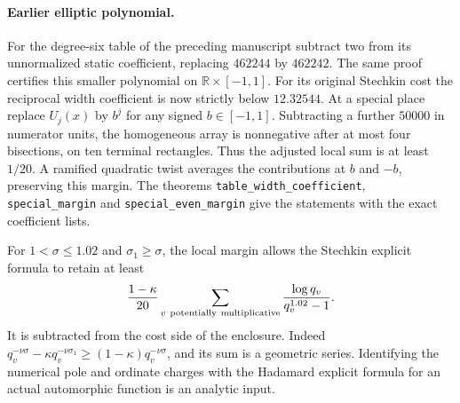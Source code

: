 \paragraph{Earlier elliptic polynomial.}
For the degree-six table of the preceding manuscript subtract two from its unnormalized static coefficient, replacing $462244$ by $462242$. The same proof certifies this smaller polynomial on $\mathbb R\times[-1,1]$. For its original Stechkin cost the reciprocal width coefficient is now strictly below $12.32544$. At a special place replace $U_j(x)$ by $b^j$ for any signed $b\in[-1,1]$. Subtracting a further $50000$ in numerator units, the homogeneous array is nonnegative after at most four bisections, on ten terminal rectangles. Thus the adjusted local sum is at least $1/20$. A ramified quadratic twist averages the contributions at $b$ and $-b$, preserving this margin. The theorems \texttt{table\_width\_coefficient}, \texttt{special\_margin} and \texttt{special\_even\_margin} give the statements with the exact coefficient lists.

For $1<\sigma\le1.02$ and $\sigma_1\ge\sigma$, the local margin allows the Stechkin explicit formula to retain at least
\[
 \frac{1-\kappa}{20}\sum_{v\ {\rm potentially\ multiplicative}}
           \frac{\log q_v}{q_v^{1.02}-1}.
\]
It is subtracted from the cost side of the enclosure. Indeed $q_v^{-\nu\sigma}-\kappa q_v^{-\nu\sigma_1}\ge(1-\kappa)q_v^{-\nu\sigma}$, and its sum is a geometric series. Identifying the numerical pole and ordinate charges with the Hadamard explicit formula for an actual automorphic function is an analytic input.
